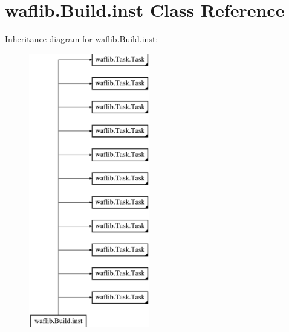\hypertarget{classwaflib_1_1_build_1_1inst}{}\section{waflib.\+Build.\+inst Class Reference}
\label{classwaflib_1_1_build_1_1inst}
Inheritance diagram for waflib.\+Build.\+inst\+:\begin{figure}[H]
\begin{center}
\leavevmode
\includegraphics[height=12.000000cm]{classwaflib_1_1_build_1_1inst}
\end{center}
\end{figure}
